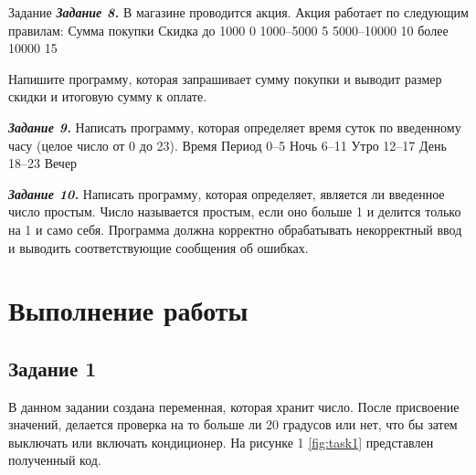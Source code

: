 \documentclass{vvsu}
\begin{document}
\begin{addition}{Задание}
    \textit{\textbf{Задание 8.}}
    В магазине проводится акция. Акция работает по следующим правилам:
    Сумма покупки 	Скидка
    до 1000 	0%
    1000–5000 	5%
    5000–10000 	10%
    более 10000 	15%

    Напишите программу, которая запрашивает сумму покупки и выводит размер скидки и итоговую сумму к оплате.

    \textit{\textbf{Задание 9.}}
    Написать программу, которая определяет время суток по введенному часу (целое число от 0 до 23).
    Время 	Период
    0–5 	Ночь
    6–11 	Утро
    12–17 	День
    18–23 	Вечер

    \textit{\textbf{Задание 10.}}
    Написать программу, которая определяет, является ли введенное число простым. Число называется простым, если оно больше 1 и делится только на 1 и само себя. Программа должна корректно обрабатывать некорректный ввод и выводить соответствующие сообщения об ошибках.

\end{addition}
\toc

\section{Выполнение работы}

\subsection{Задание 1}
В данном задании создана переменная, которая хранит число. После присвоение значений, делается проверка на то больше ли 20 градусов или нет, что бы затем выключать или включать кондиционер. На рисунке 1 \ref{fig:task1} представлен полученный код.
\end{document}
